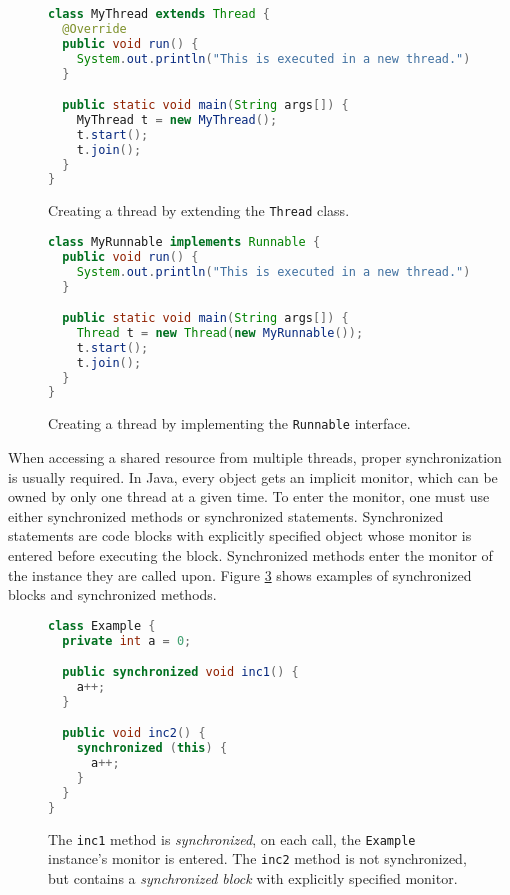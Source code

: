 \begin{figure}[hbt]
    \label{threadExtend}
\begin{lstlisting}[language=java]
class MyThread extends Thread {
  @Override
  public void run() {
    System.out.println("This is executed in a new thread.");
  }

  public static void main(String args[]) {
    MyThread t = new MyThread();
    t.start();
    t.join();
  }
}
\end{lstlisting}
    \caption{Creating a thread by extending the \texttt{Thread} class.}
\end{figure}

\begin{figure}[hbt]
    \label{threadRunnable}
\begin{lstlisting}[language=java]
class MyRunnable implements Runnable {
  public void run() {
    System.out.println("This is executed in a new thread.");
  }

  public static void main(String args[]) {
    Thread t = new Thread(new MyRunnable());
    t.start();
    t.join();
  }
}
\end{lstlisting}
    \caption{Creating a thread by implementing the \texttt{Runnable} interface.}
\end{figure}

When accessing a shared resource from multiple threads, proper synchronization
is usually required. In Java, every object gets an implicit monitor, which can
be owned by only one thread at a given time. To enter the monitor, one must use
either synchronized methods or synchronized statements. Synchronized statements
are code blocks with explicitly specified object whose monitor is entered before
executing the block. Synchronized methods enter the monitor of the instance they
are called upon. Figure \ref{synchronized} shows examples of synchronized blocks
and synchronized methods.

\begin{figure}[hbt]
    \label{synchronized}
\begin{lstlisting}[language=java]
class Example {
  private int a = 0;

  public synchronized void inc1() {
    a++;
  }

  public void inc2() {
    synchronized (this) {
      a++;
    }
  }
}
\end{lstlisting}
    \caption{The \texttt{inc1} method is \emph{synchronized}, on each call, the
    \texttt{Example} instance's monitor is entered. The \texttt{inc2} method is
    not synchronized, but contains a \emph{synchronized block} with explicitly
    specified monitor.}
\end{figure}

